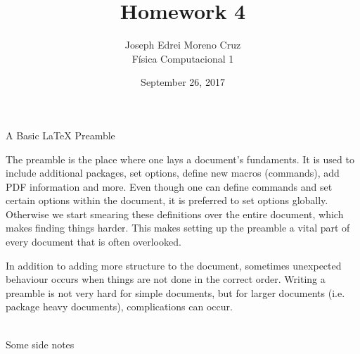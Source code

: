\documentclass[12pt,a4paper]{article}
\title{Homework 4}
\author{Joseph Edrei Moreno Cruz \\ Física Computacional 1}
\date{September 26, 2017}
\begin{document}
\maketitle

\begin{center}
\textcolor{color1}{A Basic LaTeX Preamble}
\end{center} \par
The preamble is the place where one lays a document’s fundaments. It is used to include additional packages, set options, define new macros (commands), add PDF information and more. Even though one can define commands and set certain options within the document, it is preferred to set options globally. Otherwise we start smearing these definitions over the entire document, which makes finding things harder. This makes setting up the preamble a vital part of every document that is often overlooked.  \par
In addition to adding more structure to the document, sometimes unexpected behaviour occurs when things are not done in the correct order. Writing a preamble is not very hard for simple documents, but for larger documents (i.e. package heavy documents), complications can occur.
\\
\\
\begin{center}
\textcolor{OliveGreen}{Some side notes}
\end{center} \par
\end{document}
